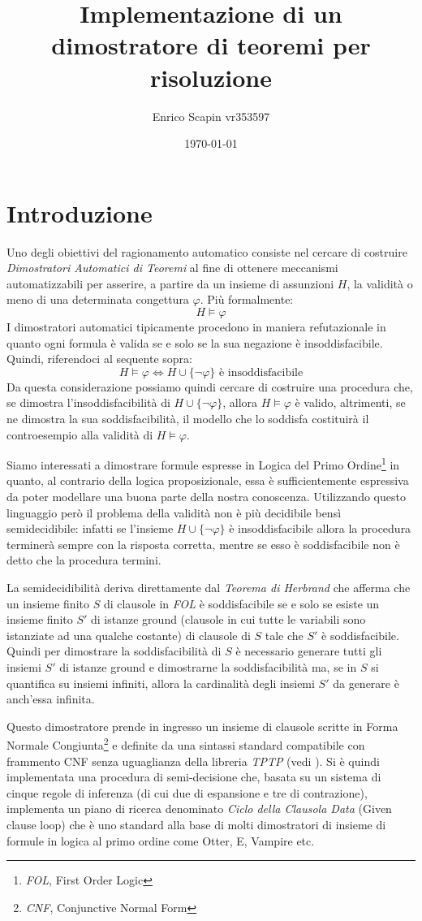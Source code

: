 \documentclass[a4paper,11pt]{article}
\title{\bf{Implementazione di un dimostratore di teoremi per risoluzione}}
\author{Enrico Scapin vr353597}
\date{\today}
\begin{document}
\maketitle

\section{Introduzione}
Uno degli obiettivi del ragionamento automatico consiste nel cercare di costruire \emph{Dimostratori Automatici di Teoremi} al fine di ottenere meccanismi automatizzabili per asserire, a partire da un insieme di assunzioni $H$, la validità o meno di una determinata congettura $\varphi$. Più formalmente:
\[ H \models \varphi \]
I dimostratori automatici tipicamente procedono in maniera refutazionale in quanto ogni formula è valida se e solo se la sua negazione è insoddisfacibile. Quindi, riferendoci al sequente sopra:
\[ H \models \varphi \Longleftrightarrow H \cup \lbrace\neg \varphi\rbrace \text{ è insoddisfacibile} \]
Da questa considerazione possiamo quindi cercare di costruire una procedura che, se dimostra l'insoddisfacibilità di $H \cup \lbrace\neg \varphi\rbrace$, allora $ H \models \varphi $ è valido, altrimenti, se ne dimostra la sua soddisfacibilità, il modello che lo soddisfa costituirà il controesempio alla validità di $ H \models \varphi $.\par
Siamo interessati a dimostrare formule espresse in Logica del Primo Ordine\footnote{\emph{FOL}, First Order Logic} in quanto, al contrario della logica proposizionale, essa è sufficientemente espressiva da poter modellare una buona parte della nostra conoscenza. Utilizzando questo linguaggio però il problema della validità non è più decidibile bensì semidecidibile: infatti se l'insieme $H \cup \lbrace\neg \varphi\rbrace $ è insoddisfacibile allora la procedura terminerà sempre con la risposta corretta, mentre se esso è soddisfacibile non è detto che la procedura termini. \par
La semidecidibilità deriva direttamente dal \emph{Teorema di Herbrand} che afferma che un insieme finito $S$ di clausole in \emph{FOL} è soddisfacibile se e solo se esiste un insieme finito $S'$ di istanze ground (clausole in cui tutte le variabili sono istanziate ad una qualche costante) di clausole di $S$ tale che $S'$ è soddisfacibile. Quindi per dimostrare la soddisfacibilità di $S$ è necessario generare tutti gli insiemi $S'$ di istanze ground e dimostrarne la soddisfacibilità ma, se in $S$ si quantifica su insiemi infiniti, allora la cardinalità degli insiemi $S'$ da generare è anch'essa infinita.\par
Questo dimostratore prende in ingresso un insieme di clausole scritte in Forma Normale Congiunta\footnote{\emph{CNF}, Conjunctive Normal Form} e definite da una sintassi standard compatibile con frammento CNF senza uguaglianza della libreria \emph{TPTP} (vedi \cite{TPTP}). Si è quindi implementata una procedura di semi-decisione che, basata su un sistema di cinque regole di inferenza (di cui due di espansione e tre di contrazione), implementa un piano di ricerca denominato \emph{Ciclo della Clausola Data} (Given clause loop) che è uno standard alla base di molti dimostratori di insieme di formule in logica al primo ordine come Otter, E, Vampire etc.
\end{document}
